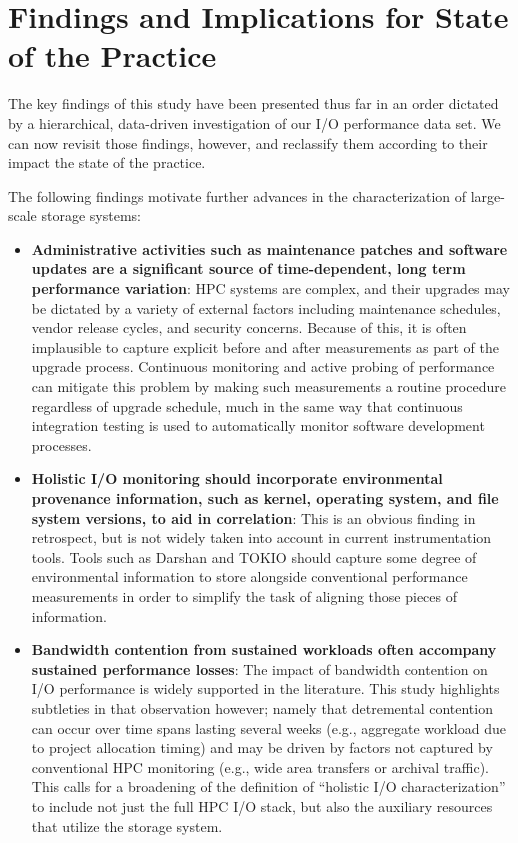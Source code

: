 \section{Findings and Implications for State of the Practice}
\label{sec:findings}

The key findings of this study have been presented thus far in an
order dictated by a hierarchical, data-driven investigation of our
I/O performance data set.  We can now revisit those findings, however,
and reclassify them according to their impact the state of
the practice.

The following findings motivate further advances in the characterization of
large-scale storage systems:

\begin{itemize}

\item \textbf{Administrative activities such as maintenance patches and
software updates are a significant source of time-dependent, long term
performance variation}: HPC systems are complex, and their upgrades may be
dictated by a variety of external factors including maintenance schedules,
vendor release cycles, and security concerns.  Because of this, it is often
implausible to capture explicit before and after measurements as part of the
upgrade process.  Continuous monitoring and active probing of performance
can mitigate this problem by making such measurements a routine procedure regardless of upgrade
schedule, much in the same way that continuous integration  testing is used
to automatically monitor software development processes.

\item \textbf{Holistic I/O monitoring should incorporate environmental
provenance information, such as kernel, operating system, and file system
versions, to aid in correlation}: 
This is an obvious finding in retrospect, but is not widely taken into
account in current instrumentation tools.  Tools such as Darshan and
TOKIO should capture some degree of environmental information 
to store alongside conventional performance measurements in order to
simplify the task of aligning those pieces of information.

\item \textbf{Bandwidth contention from sustained workloads often accompany
sustained performance losses}: The impact of bandwidth contention on I/O
performance is widely supported in the literature.  This study highlights
subtleties in that observation however; namely that detremental contention
can occur over time spans lasting several weeks (e.g., aggregate
workload due to project allocation timing) and may be driven by factors 
not captured by conventional HPC monitoring (e.g., wide area transfers or 
archival traffic).  This calls for a broadening of the definition of
``holistic I/O characterization'' to include not just the full HPC I/O
stack, but also the auxiliary resources that utilize the storage system.

\end{itemize}


